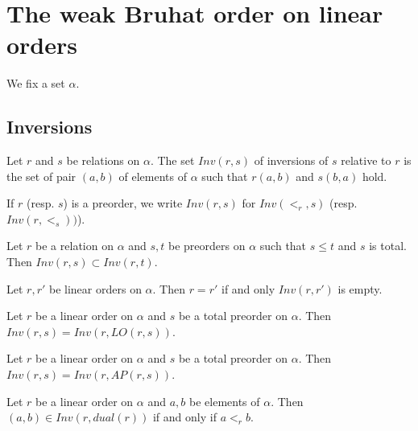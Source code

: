 \section{The weak Bruhat order on linear orders}

We fix a set $\alpha$.

\subsection{Inversions}

\begin{subdefi}[Inversions]
Let $r$ and $s$ be relations on $\alpha$. The set $Inv(r,s)$ of inversions of $s$ relative to $r$ is the set of pair $(a,b)$ of
elements of $\alpha$ such that $r(a,b)$ and $s(b,a)$ hold. 

\end{subdefi}

If $r$ (resp. $s$) is a preorder, we write $Inv(r,s)$ for $Inv(<_r,s)$ (resp. $Inv(r,<_s))$).

\begin{sublemma}
Let $r$ be a relation on $\alpha$ and $s,t$ be preorders on $\alpha$ such that $s\le t$ and $s$ is total. Then
$Inv(r,s)\subset Inv(r,t)$.

\end{sublemma}

\begin{sublemma}
Let $r,r'$ be linear orders on $\alpha$. Then $r=r'$ if and only $Inv(r,r')$ is empty.

\end{sublemma}

\begin{sublemma}
Let $r$ be a linear order on $\alpha$ and $s$ be a total preorder on $\alpha$. Then $Inv(r,s)=Inv(r,LO(r,s))$.

\end{sublemma}

\begin{sublemma}
Let $r$ be a linear order on $\alpha$ and $s$ be a total preorder on $\alpha$. Then $Inv(r,s)=Inv(r,AP(r,s))$.

\end{sublemma}

\begin{sublemma}
Let $r$ be a linear order on $\alpha$ and $a,b$ be elements of $\alpha$. Then $(a,b)\in Inv(r,dual(r))$ if and only
if $a<_r b$.

\end{sublemma}

